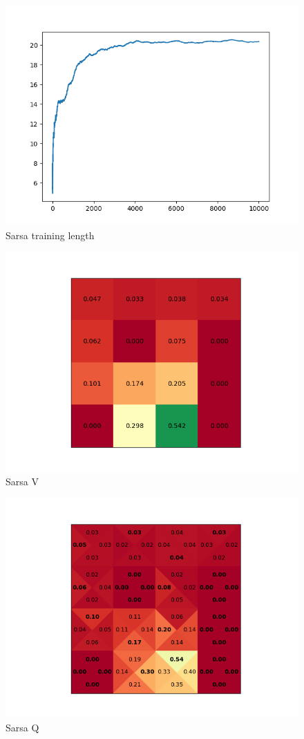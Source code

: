 \documentclass[a4paper]{article}
\begin{document}
\begin{figure}[!ht]
	\centering
	\includegraphics[width=0.8\linewidth]{4x4_sarsa_length}
	\caption{Sarsa training length}
	\label{fig:sarsalength}
\end{figure}
\begin{figure}[!ht]
	\centering
	\includegraphics[width=0.6\linewidth]{4x4_sarsa_v}
	\caption{Sarsa V}
	\label{fig:sarsareward}
\end{figure}
\begin{figure}[!ht]
	\centering
	\includegraphics[width=0.6\linewidth]{4x4_sarsa_q}
	\caption{Sarsa Q}
	\label{fig:sarsapolicy}
\end{figure}
\end{document}
